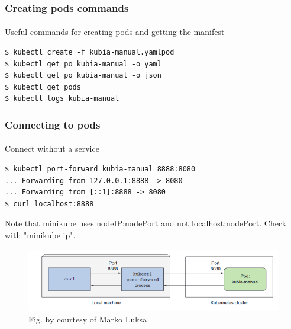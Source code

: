 \begin{frame}[fragile]
	\frametitle{Creating pods commands}
	\framesubtitle{}
	Useful commands for creating pods and getting the manifest
	\begin{lstlisting}[numbers=none, basicstyle=\ttfamily]
$ kubectl create -f kubia-manual.yamlpod
$ kubectl get po kubia-manual -o yaml
$ kubectl get po kubia-manual -o json
$ kubectl get pods
$ kubectl logs kubia-manual
	\end{lstlisting}
\end{frame}

\begin{frame}[fragile]
	\frametitle{Connecting to pods}
	\framesubtitle{}
	Connect without a service
	\begin{lstlisting}[numbers=none, basicstyle=\ttfamily]
$ kubectl port-forward kubia-manual 8888:8080
... Forwarding from 127.0.0.1:8888 -> 8080
... Forwarding from [::1]:8888 -> 8080
$ curl localhost:8888
	\end{lstlisting}
	Note that minikube uses nodeIP:nodePort and not localhost:nodePort. Check with "minikube ip".
	\begin{figure}[htbp!]
		\includegraphics[width=1\textwidth]{figures/3_5.png}
		\caption{Fig. by courtesy of Marko Luksa\cite{Luksa2018}}
		\label{fig:}
	\end{figure}
\end{frame}


